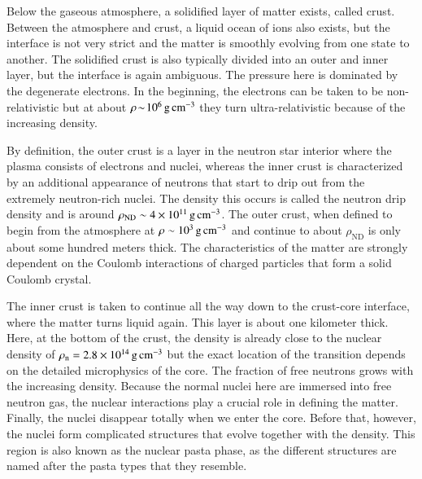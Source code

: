 Below the gaseous atmosphere, a solidified layer of matter exists, called crust.\cite[see e.g.,][for a review]{HPY07, CH08, NSCrust12}
Between the atmosphere and crust, a liquid ocean of ions also exists, but the interface is not very strict and the matter is smoothly evolving from one state to another.
The solidified crust is also typically divided into an outer and inner layer, but the interface is again ambiguous. 
The pressure here is dominated by the degenerate electrons. 
In the beginning, the electrons can be taken to be non-relativistic but at about $\rho \!\sim\! 10^{6} \, \mathrm{g}\,\mathrm{cm}^{-3}$ they turn ultra-relativistic because of the increasing density.

By definition, the outer crust is a layer in the neutron star interior where the plasma consists of electrons and nuclei, whereas the inner crust is characterized by an additional appearance of neutrons that start to drip out from the extremely neutron-rich nuclei.
The density this occurs is called the neutron drip density and is around $\rho_{\mathrm{ND}} \sim 4 \times 10^{11} \, \mathrm{g}\,\mathrm{cm}^{-3}$.
The outer crust, when defined to begin from the atmosphere at $\rho \sim 10^3 \, \mathrm{g}\,\mathrm{cm}^{-3}$ and continue to about $\rho_{\mathrm{ND}}$ is only about some hundred meters thick.
The characteristics of the matter are strongly dependent on the Coulomb interactions of charged particles that form a solid Coulomb crystal.

%

The inner crust is taken to continue all the way down to the crust-core interface, where the matter turns liquid again.
This layer is about one kilometer thick.
Here, at the bottom of the crust, the density is already close to the nuclear density of $\rho_{\mathrm{n}} = 2.8 \times 10^{14} \, \mathrm{g}\,\mathrm{cm}^{-3}$ but the exact location of the transition depends on the detailed microphysics of the core.
The fraction of free neutrons grows with the increasing density.
Because the normal nuclei here are immersed into free neutron gas, the nuclear interactions play a crucial role in defining the matter.
Finally, the nuclei disappear totally when we enter the core.
Before that, however, the nuclei form complicated structures that evolve together with the density.
This region is also known as the nuclear pasta phase, as the different structures are named after the pasta types that they resemble.\cite[see e.g.,][]{CH16}


